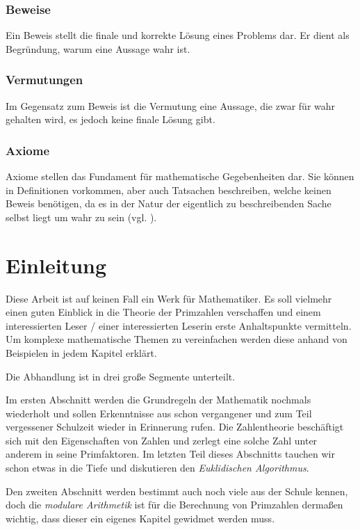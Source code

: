 \documentclass[12pt,a4paper]{article}
\theoremstyle{definition}
\begin{document}
\subsubsection*{Beweise}
Ein Beweis stellt die finale und korrekte Lösung eines Problems dar.
Er dient als Begründung, warum eine Aussage wahr ist.
\subsubsection*{Vermutungen}
Im Gegensatz zum Beweis ist die Vermutung eine Aussage, die zwar für wahr gehalten wird, es jedoch keine finale Lösung gibt.
\subsubsection*{Axiome}
Axiome stellen das Fundament für mathematische Gegebenheiten dar.
Sie können in Definitionen vorkommen, aber auch Tatsachen beschreiben, welche keinen Beweis benötigen, da es in der Natur der eigentlich zu beschreibenden Sache selbst liegt um wahr zu sein (vgl. \cite[119--122]{Houston2012}).
\newpage

\section*{Einleitung}
Diese Arbeit ist auf keinen Fall ein Werk für Mathematiker.
Es soll vielmehr einen guten Einblick in die Theorie der Primzahlen verschaffen und einem interessierten Leser / einer interessierten Leserin erste Anhaltspunkte vermitteln.
Um komplexe mathematische Themen zu vereinfachen werden diese anhand von Beispielen in jedem Kapitel erklärt.

Die Abhandlung ist in drei große Segmente unterteilt.

Im ersten Abschnitt werden die Grundregeln der Mathematik nochmals wiederholt und sollen Erkenntnisse aus schon vergangener und zum Teil vergessener Schulzeit wieder in Erinnerung rufen.
Die Zahlentheorie beschäftigt sich mit den Eigenschaften von Zahlen und zerlegt eine solche Zahl unter anderem in seine Primfaktoren.
Im letzten Teil dieses Abschnitts tauchen wir schon etwas in die Tiefe und diskutieren den \textit{Euklidischen Algorithmus}.

Den zweiten Abschnitt werden bestimmt auch noch viele aus der Schule kennen, doch die \textit{modulare Arithmetik} ist für die Berechnung von Primzahlen dermaßen wichtig, dass dieser ein eigenes Kapitel gewidmet werden muss.
\end{document}
